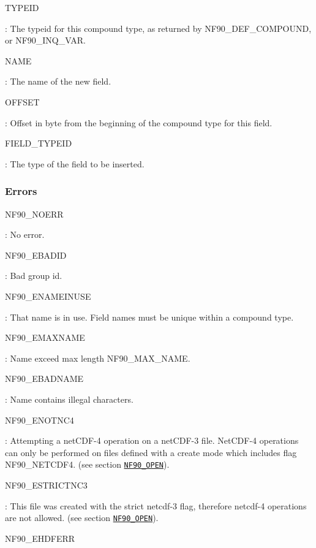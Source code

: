 {\ttfamily T\+Y\+P\+E\+ID}

\+: The typeid for this compound type, as returned by N\+F90\+\_\+\+D\+E\+F\+\_\+\+C\+O\+M\+P\+O\+U\+ND, or N\+F90\+\_\+\+I\+N\+Q\+\_\+\+V\+AR.

{\ttfamily N\+A\+ME}

\+: The name of the new field.

{\ttfamily O\+F\+F\+S\+ET}

\+: Offset in byte from the beginning of the compound type for this field.

{\ttfamily F\+I\+E\+L\+D\+\_\+\+T\+Y\+P\+E\+ID}

\+: The type of the field to be inserted.

\subsubsection*{Errors}

{\ttfamily N\+F90\+\_\+\+N\+O\+E\+RR}

\+: No error.

{\ttfamily N\+F90\+\_\+\+E\+B\+A\+D\+ID}

\+: Bad group id.

{\ttfamily N\+F90\+\_\+\+E\+N\+A\+M\+E\+I\+N\+U\+SE}

\+: That name is in use. Field names must be unique within a compound type.

{\ttfamily N\+F90\+\_\+\+E\+M\+A\+X\+N\+A\+ME}

\+: Name exceed max length N\+F90\+\_\+\+M\+A\+X\+\_\+\+N\+A\+ME.

{\ttfamily N\+F90\+\_\+\+E\+B\+A\+D\+N\+A\+ME}

\+: Name contains illegal characters.

{\ttfamily N\+F90\+\_\+\+E\+N\+O\+T\+N\+C4}

\+: Attempting a net\+C\+D\+F-\/4 operation on a net\+C\+D\+F-\/3 file. Net\+C\+D\+F-\/4 operations can only be performed on files defined with a create mode which includes flag N\+F90\+\_\+\+N\+E\+T\+C\+D\+F4. (see section \href{#NF90_005fOPEN}{\tt N\+F90\+\_\+\+O\+P\+EN}).

{\ttfamily N\+F90\+\_\+\+E\+S\+T\+R\+I\+C\+T\+N\+C3}

\+: This file was created with the strict netcdf-\/3 flag, therefore netcdf-\/4 operations are not allowed. (see section \href{#NF90_005fOPEN}{\tt N\+F90\+\_\+\+O\+P\+EN}).

{\ttfamily N\+F90\+\_\+\+E\+H\+D\+F\+E\+RR}

